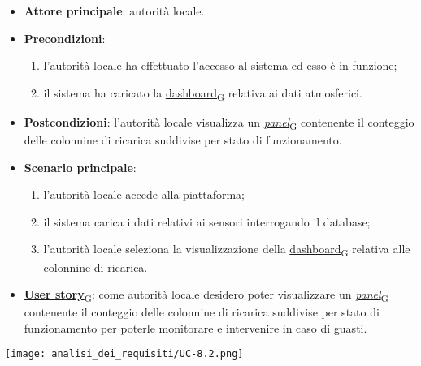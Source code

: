 \begin{itemize}
	\item \textbf{Attore principale}: autorità locale.
	\item \textbf{Precondizioni}:
	      \begin{enumerate}
		      \item l'autorità locale ha effettuato l'accesso al sistema ed esso è in funzione;
		      \item il sistema ha caricato la \href{https://7last.github.io/docs/pb/documentazione-interna/glossario\#dashboard}{dashboard\textsubscript{G}} relativa ai dati atmosferici.
	      \end{enumerate}
	\item \textbf{Postcondizioni}: l'autorità locale visualizza un \href{https://7last.github.io/docs/pb/documentazione-interna/glossario\#panel}{\textit{panel}\textsubscript{G}} contenente il conteggio delle colonnine di ricarica suddivise per stato di funzionamento.
	\item \textbf{Scenario principale}:
	      \begin{enumerate}
		      \item l'autorità locale accede alla piattaforma;
		      \item il sistema carica i dati relativi ai sensori interrogando il database;
		      \item l'autorità locale seleziona la visualizzazione della \href{https://7last.github.io/docs/pb/documentazione-interna/glossario\#dashboard}{dashboard\textsubscript{G}} relativa alle colonnine di ricarica.
	      \end{enumerate}
	\item \href{https://7last.github.io/docs/pb/documentazione-interna/glossario\#user-story}{\textbf{User story}\textsubscript{G}}:
	      come autorità locale desidero poter visualizzare un \href{https://7last.github.io/docs/pb/documentazione-interna/glossario\#panel}{\textit{panel}\textsubscript{G}} contenente il conteggio delle colonnine di ricarica suddivise per stato di funzionamento
	      per poterle monitorare e intervenire in caso di guasti.
\end{itemize}
\begin{center}
	\texttt{[image: analisi\_dei\_requisiti/UC-8.2.png]}
\end{center}

